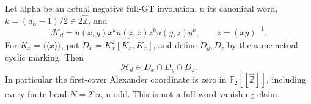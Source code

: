 Let alpha be an actual negative full-GT involution, u its canonical
word, \(k=(d_\alpha-1)/2\in2\widehat{\mathbb Z}\), and
\[
 \mathcal H_d=u(x,y)x^k u(z,x)z^k u(y,z)y^k,
 \qquad z=(xy)^{-1}.
 \tag{A.101.1}
\]
For \(K_x=\overline{\langle\!\langle x\rangle\!\rangle}\),
put \(D_x=\overline{K_x^2[K_x,K_x]}\), and define \(D_y,D_z\)
by the same actual cyclic marking. Then
\[
                 \mathcal H_d\in D_x\cap D_y\cap D_z.
 \tag{A.101.2}
\]
In particular the first-cover Alexander coordinate is zero in
\(\mathbb F_2[[\widehat{\mathbb Z}]]\), including every finite
head \(N=2^r n\), n odd. This is not a full-word vanishing claim.

